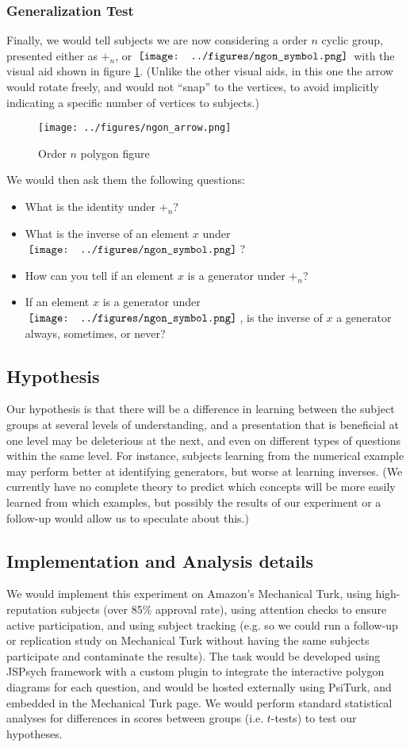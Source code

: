 \documentclass[11pt]{article}
\newcommand{\ngon}{\,\vcenter{\hbox{\texttt{[image: ../figures/ngon\_symbol.png]}}}\,}
\begin{document}
\subsubsection{Generalization Test}
Finally, we would tell subjects we are now considering a order $n$ cyclic group, presented either as $+_n$, or $\ngon$ with the visual aid shown in figure \ref{ngonex}. (Unlike the other visual aids, in this one the arrow would rotate freely, and would not ``snap'' to the vertices, to avoid implicitly indicating a specific number of vertices to subjects.) 
\begin{figure}[H] \centering \texttt{[image: ../figures/ngon\_arrow.png]} \caption{Order $n$ polygon figure} \label{ngonex} \end{figure} \noindent
We would then ask them the following questions: 
\begin{itemize}
\item What is the identity under $+_n$?
\item What is the inverse of an element $x$ under $\ngon$?
\item How can you tell if an element $x$ is a generator under $+_n$?
\item If an element $x$ is a generator under $\ngon$, is the inverse of $x$ a generator always, sometimes, or never?
\end{itemize}
\subsection{Hypothesis}
Our hypothesis is that there will be a difference in learning between the subject groups at several levels of understanding, and a presentation that is beneficial at one level may be deleterious at the next, and even on different types of questions within the same level. For instance, subjects learning from the numerical example may perform better at identifying generators, but worse at learning inverses. (We currently have no complete theory to predict which concepts will be more easily learned from which examples, but possibly the results of our experiment or a follow-up would allow us to speculate about this.)
\subsection{Implementation and Analysis details}
We would implement this experiment on Amazon's Mechanical Turk, using high-reputation subjects (over 85\% approval rate), using attention checks to ensure active participation, and using subject tracking (e.g. so we could run a follow-up or replication study on Mechanical Turk without having the same subjects participate and contaminate the results). The task would be developed using JSPsych framework with a custom plugin to integrate the interactive polygon diagrams for each question, and would be hosted externally using PsiTurk, and embedded in the Mechanical Turk page. We would perform standard statistical analyses for differences in scores between groups (i.e. $t$-tests) to test our hypotheses. 
\end{document}
